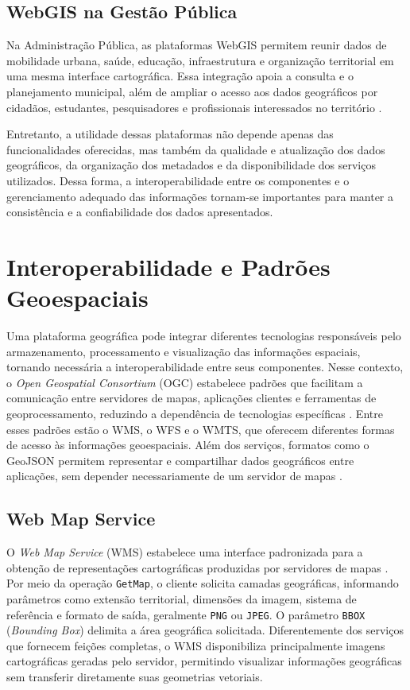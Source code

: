 \subsection{WebGIS na Gestão Pública}
\label{sec:webgis-gestao-publica}

Na Administração Pública, as plataformas \gls{WebGIS} permitem reunir dados de mobilidade urbana, saúde, educação, infraestrutura e organização territorial em uma mesma interface cartográfica. Essa integração apoia a consulta e o planejamento municipal, além de ampliar o acesso aos dados geográficos por cidadãos, estudantes, pesquisadores e profissionais interessados no território \cite{Alcantara2015,Marotta2020}.

Entretanto, a utilidade dessas plataformas não depende apenas das funcionalidades oferecidas, mas também da qualidade e atualização dos dados geográficos, da organização dos metadados e da disponibilidade dos serviços utilizados. Dessa forma, a interoperabilidade entre os componentes e o gerenciamento adequado das informações tornam-se importantes para manter a consistência e a confiabilidade dos dados apresentados.

\section{Interoperabilidade e Padrões Geoespaciais}
\label{sec:interoperabilidade}

Uma plataforma geográfica pode integrar diferentes tecnologias responsáveis pelo armazenamento, processamento e visualização das informações espaciais, tornando necessária a interoperabilidade entre seus componentes. Nesse contexto, o \textit{Open Geospatial Consortium} (OGC) estabelece padrões que facilitam a comunicação entre servidores de mapas, aplicações clientes e ferramentas de geoprocessamento, reduzindo a dependência de tecnologias específicas \cite{OGCWMS,OGCWFS,OGCWMTS}. Entre esses padrões estão o WMS, o WFS e o WMTS, que oferecem diferentes formas de acesso às informações geoespaciais. Além dos serviços, formatos como o GeoJSON permitem representar e compartilhar dados geográficos entre aplicações, sem depender necessariamente de um servidor de mapas \cite{RFC7946}.

\subsection{Web Map Service}
\label{sec:wms}

O \textit{Web Map Service} (WMS) estabelece uma interface padronizada para a obtenção de representações cartográficas produzidas por servidores de mapas \cite{OGCWMS}.  Por meio da operação \texttt{GetMap}, o cliente solicita camadas geográficas, informando parâmetros como extensão territorial, dimensões da imagem, sistema de referência e formato de saída, geralmente \texttt{PNG} ou \texttt{JPEG}. O parâmetro \texttt{BBOX} (\textit{Bounding Box}) delimita a área geográfica solicitada. Diferentemente dos serviços que fornecem feições completas, o \gls{WMS} disponibiliza principalmente imagens cartográficas geradas pelo servidor, permitindo visualizar informações geográficas sem transferir diretamente suas geometrias vetoriais.

